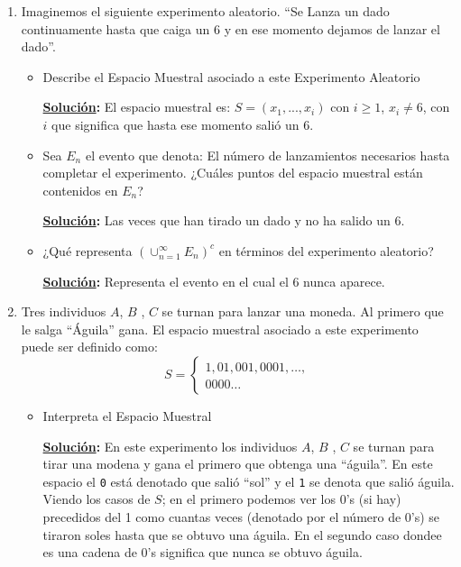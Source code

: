\documentclass[11pt,letterpaper]{report}
\newcommand{\sol}{\textbf{\underline{Solución}: }} %
\begin{document}
\begin{enumerate}

\item Imaginemos el siguiente experimento aleatorio. ``Se Lanza un dado continuamente hasta que
caiga un 6 y en ese momento dejamos de lanzar el dado''.

\begin{itemize}
    \item Describe el Espacio Muestral asociado a este Experimento Aleatorio

    \sol El espacio muestral es: $S = (x_1,...,x_i)$ con $i \geq 1$, $x_i \not= 6$, con
    $i$ que significa que hasta ese momento salió un 6.

    \item Sea $E_n$ el evento que denota: El número de lanzamientos necesarios hasta completar el
    experimento. ¿Cuáles puntos del espacio muestral están contenidos en $E_n$?
    
    \sol Las veces que han tirado un dado y no ha salido un 6.

    \item ¿Qué representa $(\cup_{n=1}^{\infty} E_n)^c$ en términos del experimento aleatorio?
    
    \sol Representa el evento en el cual el 6 nunca aparece.    
    
\end{itemize}

\item Tres individuos $A$, $B$ , $C$ se turnan para lanzar una moneda. Al primero que le salga
``Águila'' gana. El espacio muestral asociado a este experimento puede ser definido como:
\[
    S =
    \begin{cases}
        1, 01, 001, 0001, \ldots,\\
        0000\ldots
    \end{cases}
\]

\begin{itemize}
    \item Interpreta el Espacio Muestral
    
    \sol En este experimento los individuos $A$, $B$ , $C$ se turnan para tirar una modena y gana
    el primero que obtenga una ``águila''. En este espacio el \texttt{0} está denotado que salió
    ``sol'' y el \texttt{1} se denota que salió águila. Viendo los casos de $S$; en el
    primero podemos ver los 0's (si hay) precedidos del 1 como cuantas veces (denotado por el
    número de 0's) se tiraron soles hasta que se obtuvo una águila. En el segundo caso dondee es
    una cadena de 0's significa que nunca se obtuvo águila.


\end{itemize}
\end{enumerate}
\end{document}
